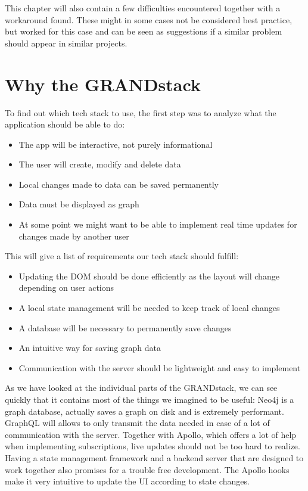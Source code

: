 This chapter will also contain a few difficulties encountered together with a workaround found. These might in some cases not be considered best practice, but worked for this case and can be seen as suggestions if a similar problem should appear in similar projects.

\section{Why the GRANDstack}
To find out which tech stack to use, the first step was to analyze what the application should be able to do:
\begin{itemize}
\item The app will be interactive, not purely informational
\item The user will create, modify and delete data
\item Local changes made to data can be saved permanently
\item Data must be displayed as graph
\item At some point we might want to be able to implement real time updates for changes made by another user
\end{itemize}
This will give a list of requirements our tech stack should fulfill:
\begin{itemize}
\item Updating the DOM should be done efficiently as the layout will change depending on user actions
\item A local state management will be needed to keep track of local changes
\item A database will be necessary to permanently save changes
\item An intuitive way for saving graph data
\item Communication with the server should be lightweight and easy to implement
\end{itemize}

As we have looked at the individual parts of the GRANDstack, we can see quickly that it contains most of the things we imagined to be useful: Neo4j is a graph database, actually saves a graph on disk and is extremely performant. GraphQL will allows to only transmit the data needed in case of a lot of communication with the server. Together with Apollo, which offers a lot of help when implementing subscriptions, live updates should not be too hard to realize. Having a state management framework and a backend server that are designed to work together also promises for a trouble free development. The Apollo hooks make it very intuitive to update the UI according to state changes.

